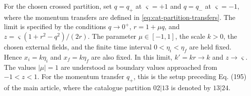 \documentclass[11pt,a4paper]{article}
\begin{document}
For the chosen crossed partition, set $ q=q_+ $ at $ \varsigma=+1 $ and $ q=q_- $ at $ \varsigma=-1 $, where the momentum transfers are defined in \eqref{eq:cat-partition-transfers}. The limit is specified by the conditions $ q\to0^+ $, $ r=1+\mu q $, and $ z=\varsigma(1+r^2-q^2)/(2r) $. The parameter $ \mu\in[-1,1] $, the scale $ k>0 $, the chosen external fields, and the finite time interval $ 0<\eta_i<\eta_f $ are held fixed. Hence $ x_i=k\eta_i $ and $ x_f=k\eta_f $ are also fixed. In this limit, $ k'=kr\to k $ and $ z\to\varsigma $. The values $ |\mu|=1 $ are understood as boundary values approached from $ -1<z<1 $. For the momentum transfer $ q_+ $, this is the setup preceding Eq. (195) of the main article, where the catalogue partition $ 02|13 $ is denoted by $ 13|24 $.
\end{document}
